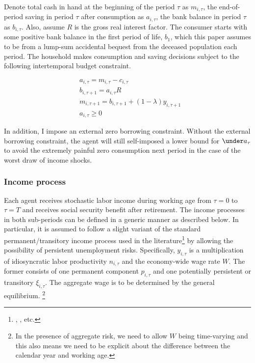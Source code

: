  Denote total cash in hand at the beginning of the period
\(\tau\) as $m_{i,\tau}$, the end-of-period saving in period $\tau$ after consumption as $a_{i,\tau}$, the bank balance in period $\tau$ as $b_{i,\tau}$. Also, assume 
$R$ is the gross real interest factor. The consumer starts with some positive bank balance in the first period of life,  $b_1$, which this paper assumes to be from a lump-sum accidental bequest from the deceased population each period. The household makes consumption and saving decisions subject to the following intertemporal budget constraint.

\begin{equation}
\begin{split}
& a_{i,\tau} = m_{i,\tau} - c_{i,\tau} \\
& b_{i,\tau+1} = a_{i,\tau} R  \\
& m_{i,\tau+1}   = b_{i,\tau+1}+(1-\lambda)y_{i,\tau+1}\\
& a_{i,\tau} \geq 0 
\end{split}
\end{equation}

In addition, I impose an external zero borrowing constraint.  Without the external borrowing constraint, the agent will still self-imposed a lower bound for $\under a_\tau$ to avoid the extremely painful zero consumption next period in the case of the worst draw of income shocks. 



\subsubsection{Income process}

Each agent receives stochastic labor income during working age from $\tau=0$ to $\tau=T$ and receives social security benefit after retirement. The income processes in both sub-periods can be defined in a generic manner as described below. In particular, it is assumed to follow a slight variant of the standard permanent/transitory income process used in the literature\footnote{\cite{carroll2017distribution}, \cite{kaplan2018microeconomic}, etc.} by allowing the possibility of persistent unemployment risks. Specifically, $y_{i,\tau}$ is a multiplication of idiosyncratic labor productivity $n_{i,\tau}$ and the economy-wide wage rate $W$. The former consists of one permanent component $p_{i,\tau}$ and one potentially persistent or transitory $\xi_{i,\tau}$. The aggregate wage is to be determined by the general equilibrium. \footnote{In the presence of aggregate risk, we need to allow $W$ being time-varying and this also means we need to be explicit about the difference between the calendar year and working age.} 

